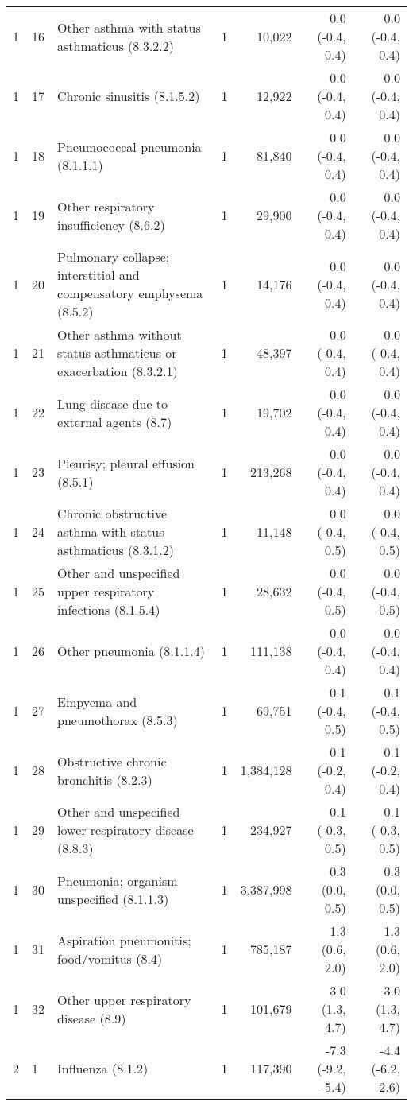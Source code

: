 \begin{tabular}{llp{6.5cm}rrrr}
   1 & 16 & Other asthma with status asthmaticus (8.3.2.2) &  1 & 10,022 & 0.0 (-0.4, 0.4) & 0.0 (-0.4, 0.4) \\ 
   1 & 17 & Chronic sinusitis (8.1.5.2) &  1 & 12,922 & 0.0 (-0.4, 0.4) & 0.0 (-0.4, 0.4) \\ 
   1 & 18 & Pneumococcal pneumonia (8.1.1.1) &  1 & 81,840 & 0.0 (-0.4, 0.4) & 0.0 (-0.4, 0.4) \\ 
   1 & 19 & Other respiratory insufficiency (8.6.2) &  1 & 29,900 & 0.0 (-0.4, 0.4) & 0.0 (-0.4, 0.4) \\ 
   1 & 20 & Pulmonary collapse; interstitial and compensatory emphysema (8.5.2) &  1 & 14,176 & 0.0 (-0.4, 0.4) & 0.0 (-0.4, 0.4) \\ 
   1 & 21 & Other asthma without status asthmaticus or exacerbation (8.3.2.1) &  1 & 48,397 & 0.0 (-0.4, 0.4) & 0.0 (-0.4, 0.4) \\ 
   1 & 22 & Lung disease due to external agents (8.7) &  1 & 19,702 & 0.0 (-0.4, 0.4) & 0.0 (-0.4, 0.4) \\ 
   1 & 23 & Pleurisy; pleural effusion (8.5.1) &  1 & 213,268 & 0.0 (-0.4, 0.4) & 0.0 (-0.4, 0.4) \\ 
   1 & 24 & Chronic obstructive asthma with status asthmaticus (8.3.1.2) &  1 & 11,148 & 0.0 (-0.4, 0.5) & 0.0 (-0.4, 0.5) \\ 
   1 & 25 & Other and unspecified upper respiratory infections (8.1.5.4) &  1 & 28,632 & 0.0 (-0.4, 0.5) & 0.0 (-0.4, 0.5) \\ 
   1 & 26 & Other pneumonia (8.1.1.4) &  1 & 111,138 & 0.0 (-0.4, 0.4) & 0.0 (-0.4, 0.4) \\ 
   1 & 27 & Empyema and pneumothorax (8.5.3) &  1 & 69,751 & 0.1 (-0.4, 0.5) & 0.1 (-0.4, 0.5) \\ 
   1 & 28 & Obstructive chronic bronchitis (8.2.3) &  1 & 1,384,128 & 0.1 (-0.2, 0.4) & 0.1 (-0.2, 0.4) \\ 
   1 & 29 & Other and unspecified lower respiratory disease (8.8.3) &  1 & 234,927 & 0.1 (-0.3, 0.5) & 0.1 (-0.3, 0.5) \\ 
   1 & 30 & Pneumonia; organism unspecified (8.1.1.3) &  1 & 3,387,998 & 0.3 (0.0, 0.5) & 0.3 (0.0, 0.5) \\ 
   1 & 31 & Aspiration pneumonitis; food/vomitus (8.4) &  1 & 785,187 & 1.3 (0.6, 2.0) & 1.3 (0.6, 2.0) \\ 
   1 & 32 & Other upper respiratory disease (8.9) &  1 & 101,679 & 3.0 (1.3, 4.7) & 3.0 (1.3, 4.7) \\ 
   2 &  1 & Influenza (8.1.2) &  1 & 117,390 & -7.3 (-9.2, -5.4) & -4.4 (-6.2, -2.6) \\ 

\end{tabular}
